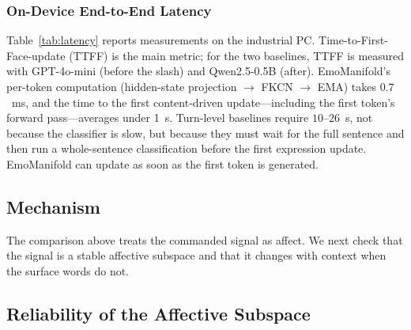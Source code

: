\documentclass[letterpaper, 10 pt, conference]{ieeeconf/ieeeconf}
\begin{document}
\begin{table}[t]
    \caption{On-device deployment latency (mean $\pm$ std., $n{=}20$). TTFF: time to first semantically-driven face update.}
    \label{tab:latency}
    \centering
    \end{table}


\subsubsection{On-Device End-to-End Latency}
Table~\ref{tab:latency} reports measurements on the industrial PC. Time-to-First-Face-update (TTFF) is the main metric; for the two baselines, TTFF is measured with GPT-4o-mini (before the slash) and Qwen2.5-0.5B (after). EmoManifold's per-token computation (hidden-state projection $\to$ FKCN $\to$ EMA) takes $0.7$~ms, and the time to the first content-driven update---including the first token's forward pass---averages under 1~s. Turn-level baselines require $10$--$26$~s, not because the classifier is slow, but because they must wait for the full sentence and then run a whole-sentence classification before the first expression update. EmoManifold can update as soon as the first token is generated.


\subsection{Mechanism}
The comparison above treats the commanded signal as affect. We next check that the signal is a stable affective subspace and that it changes with context when the surface words do not.

\subsection{Reliability of the Affective Subspace}
\label{sec:exp_subspace}
\end{document}

